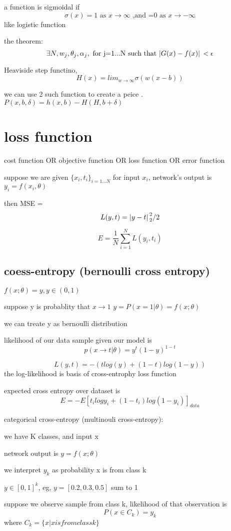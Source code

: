 \documentclass[10pt]{article}
\theoremstyle{break}
\begin{document}
a function is sigmoidal if $$\sigma(x)=1 \text{ as } x\rightarrow\infty\text{ ,and =0 as }x \rightarrow-\infty$$
like logistic function

the theorem: 
$$\exists N, w_j, \theta_j, \alpha_j,\text{ for j=1...N such that }\abs*{G(x)-f(x)}<\epsilon$$

Heaviside step functino, $$H(x)=lim_{w\rightarrow\infty}\sigma(w(x-b))$$

we can use 2 such function to create a peice .
$P(x,b,\delta)=h(x,b)-H(H,b+\delta )$

\section{loss function}
cost function OR objective function OR loss function OR error function 

suppose we are given $\{x_i, t_i\}_{i=1...N}$ for input $x_i$, network's output is 
$y_i=f(x_i,\theta)$

then MSE = 
$$L(y,t) = \abs*{y-t}^2_2/2$$

$$E=\frac{1}{N}\sum_{i=1}^N L(y_i,t_i)$$

\subsection{coess-entropy (bernoulli cross entropy)}
$f(x;\theta)=y, y\in(0,1)$

suppose y is probablity that $x\rightarrow 1$
$y=P(x=1|\theta)=f(x;\theta)$

we can treate y as bernoulli distribution 

likelihood of our data sample given our model is 
$$p(x\rightarrow t|\theta)=y^t(1-y)^{1-t}$$

$$L(y,t)=-(tlog(y)+(1-t)log(1-y))$$
the log-likelihood is basis of cross-entrophy loss function

expected cross entropy over dataset is 
$$E = -E [t_i log y_i + (1-t_i)log(1-y_i)]_{data}$$

categorical cross-entropy (multinouli cross-entropy):

we have K classes, and input x

network output is $y=f(x;\theta)$

we interpret $y_k$ as probability x is from class k

$y\in[0,1]^k $, eg, $y=[0.2,0.3,0.5]$ sum to 1

suppose we observe sample from class k, likelihood of that observation is 
$$P(x\in C_k)=y_k$$
where $C_k=\{x|x is from class k\}$
\end{document}
